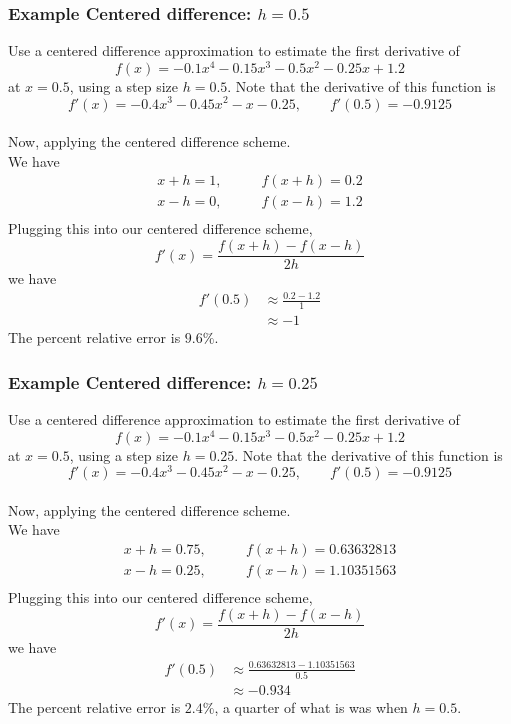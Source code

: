 \documentclass{if-beamer}
\begin{document}
\begin{frame}
	\frametitle{Example Centered difference: $h= 0.5$}
	Use a centered difference approximation to estimate the first derivative of
	$$f(x) = -0.1x^4-0.15x^3-0.5x^2-0.25x+1.2 $$
	at $x=0.5$, using a step size $h = 0.5$. Note that the derivative of this function is
	$$f'(x) = -0.4x^3-0.45x^2-x-0.25, \qquad f'(0.5) = -0.9125$$
	\\\vspace{5pt}
	Now, applying the centered difference scheme.\\\vspace{5pt}
	We have
	\begin{align*}
		x+h = 1, \qquad &f(x+h) = 0.2\\
		x-h = 0, \qquad &f(x-h) = 1.2\\
	\end{align*}
	Plugging this into our centered difference scheme, 
	$$f'(x) = \frac{f(x+h)-f(x-h)}{2h} $$
	we have
	\begin{align*}
		f'(0.5) &\approx \frac{0.2-1.2}{1} \\
		&\approx -1
	\end{align*}
	The percent relative error is $9.6\%$.
\end{frame}

\begin{frame}
	\frametitle{Example Centered difference: $h= 0.25$}
	Use a centered difference approximation to estimate the first derivative of
	$$f(x) = -0.1x^4-0.15x^3-0.5x^2-0.25x+1.2 $$
	at $x=0.5$, using a step size $h = 0.25$. Note that the derivative of this function is
	$$f'(x) = -0.4x^3-0.45x^2-x-0.25, \qquad f'(0.5) = -0.9125$$
	\\\vspace{5pt}
	Now, applying the centered difference scheme.\\\vspace{5pt}
	We have
	\begin{align*}
		x+h = 0.75, \qquad &f(x+h) = 0.63632813\\
		x-h = 0.25, \qquad &f(x-h) = 1.10351563\\
	\end{align*}
	Plugging this into our centered difference scheme, 
	$$f'(x) = \frac{f(x+h)-f(x-h)}{2h} $$
	we have
	\begin{align*}
		f'(0.5) &\approx \frac{0.63632813-1.10351563}{0.5} \\
		&\approx -0.934
	\end{align*}
	The percent relative error is $2.4\%$, a quarter of what is was when $h=0.5$.
\end{frame}
\end{document}
